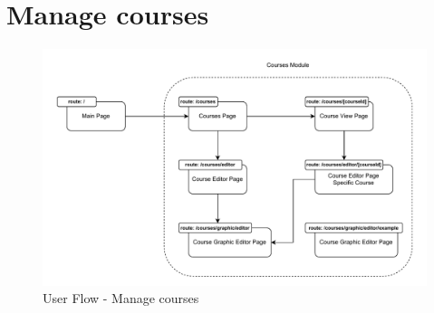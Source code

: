 \section{Manage courses}

\begin{figure}[h]
    \centering
    \includegraphics[scale=0.85]{images/course-manage-flow.pdf}
    \caption{User Flow - Manage courses}
    \label{fig:course-manage-flow}
\end{figure}

